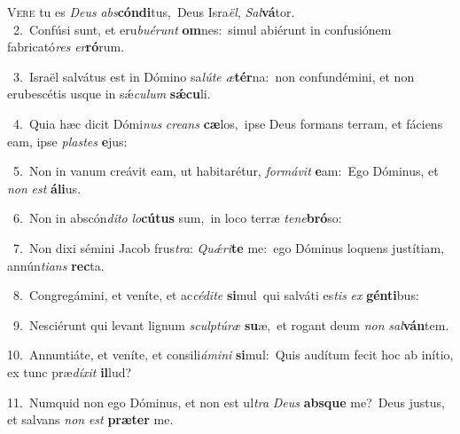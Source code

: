 \lettrine{\initial\textcolor{\initialcolor}{V}}{ere} tu es \textit{De}\-\textit{us} \textit{abs}\-\textbf{cón}\textbf{di}tus,~\star Deus Isra\-\textit{ël}\-, \textit{Sal}\-\textbf{vá}tor.\\
{\numbfont\textcolor{\numbcolor}{~2.}}~Confúsi sunt, et eru\-\textit{bu}\-\textit{é}\textit{runt} \textbf{om}\-nes:~\star simul abiérunt in confusiónem fabricató\textit{res} \textit{er}\-\textbf{ró}rum.\par
{\numbfont\textcolor{\numbcolor}{~3.}}~Israël salvátus est in Dómino sa\-\textit{lú}\-\textit{te} \textit{æ}\-\textbf{tér}na:~\star non confundémini, et non erubescétis usque in sǽ\-\textit{cu}\-\textit{lum} \textbf{sǽ}\-\textbf{cu}li.\par
{\numbfont\textcolor{\numbcolor}{~4.}}~Quia hæc dicit Dómi\textit{nus} \textit{cre}\-\textit{ans} \textbf{cæ}\-los,~\star ipse Deus formans terram, et fáciens eam, ipse \textit{plas}\-\textit{tes} \textbf{e}\-jus:\par
{\numbfont\textcolor{\numbcolor}{~5.}}~Non in vanum creávit eam, ut habitarétur, \textit{for}\-\textit{má}\textit{vit} \textbf{e}\-am:~\star Ego Dóminus, et \textit{non} \textit{est} \textbf{á}\-\textbf{li}us.\par
{\numbfont\textcolor{\numbcolor}{~6.}}~Non in abscón\-\textit{di}\-\textit{to} \textit{lo}\-\textbf{cú}\textbf{tus} sum,~\star in loco terræ \textit{te}\-\textit{ne}\textbf{bró}so:\par
{\numbfont\textcolor{\numbcolor}{~7.}}~Non dixi sémini Jacob frus\-\textit{tra}\-: \textit{Quǽ}\-\textit{ri}\textbf{te} me:~\star ego Dóminus loquens justítiam, annún\-\textit{ti}\-\textit{ans} \textbf{rec}\-ta.\par
{\numbfont\textcolor{\numbcolor}{~8.}}~Congregámini, et veníte, et ac\-\textit{cé}\-\textit{di}\textit{te} \textbf{si}\-mul~\star qui salváti es\textit{tis} \textit{ex} \textbf{gén}\-\textbf{ti}bus:\par
{\numbfont\textcolor{\numbcolor}{~9.}}~Nesciérunt qui levant lignum \textit{sculp}\-\textit{tú}\textit{ræ} \textbf{su}\-æ,~\star et rogant deum \textit{non} \textit{sal}\-\textbf{ván}tem.\par
{\numbfont\textcolor{\numbcolor}{10.}}~Annuntiáte, et veníte, et consili\-\textit{á}\-\textit{mi}\textit{ni} \textbf{si}\-mul:~\star Quis audítum fecit hoc ab inítio, ex tunc præ\-\textit{dí}\-\textit{xit} \textbf{il}\-lud?\par
{\numbfont\textcolor{\numbcolor}{11.}}~Numquid non ego Dóminus, et non est ul\textit{tra} \textit{De}\-\textit{us} \textbf{abs}\-\textbf{que} me?~\star Deus justus, et salvans \textit{non} \textit{est} \textbf{præ}\-\textbf{ter} me.\par
